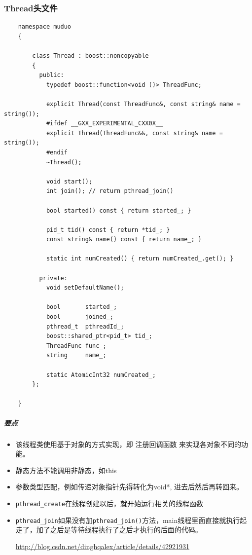\documentclass[UTF8,a4paper,8pt]{ctexbook}
\begin{document}
			\subsubsection{Thread头文件}
				\begin{lstlisting}
	namespace muduo
	{
		
		class Thread : boost::noncopyable
		{
		  public:
			typedef boost::function<void ()> ThreadFunc;
			
			explicit Thread(const ThreadFunc&, const string& name = string());
			#ifdef __GXX_EXPERIMENTAL_CXX0X__
			explicit Thread(ThreadFunc&&, const string& name = string());
			#endif
			~Thread();
			
			void start();
			int join(); // return pthread_join()
			
			bool started() const { return started_; }

			pid_t tid() const { return *tid_; }
			const string& name() const { return name_; }
			
			static int numCreated() { return numCreated_.get(); }
			
		  private:
			void setDefaultName();
			
			bool       started_;
			bool       joined_;
			pthread_t  pthreadId_;
			boost::shared_ptr<pid_t> tid_;
			ThreadFunc func_;
			string     name_;
			
			static AtomicInt32 numCreated_;
		};
		
	}
				\end{lstlisting}
			
			\subparagraph{要点}	
				\begin{itemize}[itemindent = 2em]
					\item 该线程类使用基于对象的方式实现，即 注册回调函数 来实现各对象不同的功能。
					\item 静态方法不能调用非静态，如this 
					\item 参数类型匹配，例如传递对象指针先得转化为void*, 进去后然后再转回来。
					\item \verb|pthread_create|在线程创建以后，就开始运行相关的线程函数
					\item \verb|pthread_join|如果没有加\verb|pthread_join()|方法，main线程里面直接就执行起走了，加了之后是等待线程执行了之后才执行的后面的代码。
					
					\url{http://blog.csdn.net/dinghqalex/article/details/42921931}
				\end{itemize}
				
\end{document}
